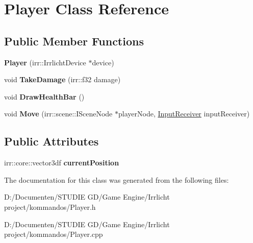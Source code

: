 \hypertarget{class_player}{}\section{Player Class Reference}
\label{class_player}
\subsection*{Public Member Functions}
\begin{DoxyCompactItemize}
\item 
\mbox{\label{class_player_ac207dd2957a2e3c4e734a9a074c2321d}} 
{\bfseries Player} (irr\+::\+Irrlicht\+Device $\ast$device)
\item 
\mbox{\label{class_player_ae9f5a597f15e29673c47abe47c3f1d79}} 
void {\bfseries Take\+Damage} (irr\+::f32 damage)
\item 
\mbox{\label{class_player_aa6cc636d92ca5ccba15a5af2ef7f224a}} 
void {\bfseries Draw\+Health\+Bar} ()
\item 
\mbox{\label{class_player_af8f50f5e8d8cb980959ba94655a0fcc1}} 
void {\bfseries Move} (irr\+::scene\+::\+I\+Scene\+Node $\ast$player\+Node, \mbox{\hyperlink{class_input_receiver}{Input\+Receiver}} input\+Receiver)
\end{DoxyCompactItemize}
\subsection*{Public Attributes}
\begin{DoxyCompactItemize}
\item 
\mbox{\label{class_player_a83dd8a4ec58053dd77e3f5e3e9b8e26e}} 
irr\+::core\+::vector3df {\bfseries current\+Position}
\end{DoxyCompactItemize}


The documentation for this class was generated from the following files\+:\begin{DoxyCompactItemize}
\item 
D\+:/\+Documenten/\+S\+T\+U\+D\+I\+E G\+D/\+Game Engine/\+Irrlicht project/kommandos/Player.\+h\item 
D\+:/\+Documenten/\+S\+T\+U\+D\+I\+E G\+D/\+Game Engine/\+Irrlicht project/kommandos/Player.\+cpp\end{DoxyCompactItemize}
